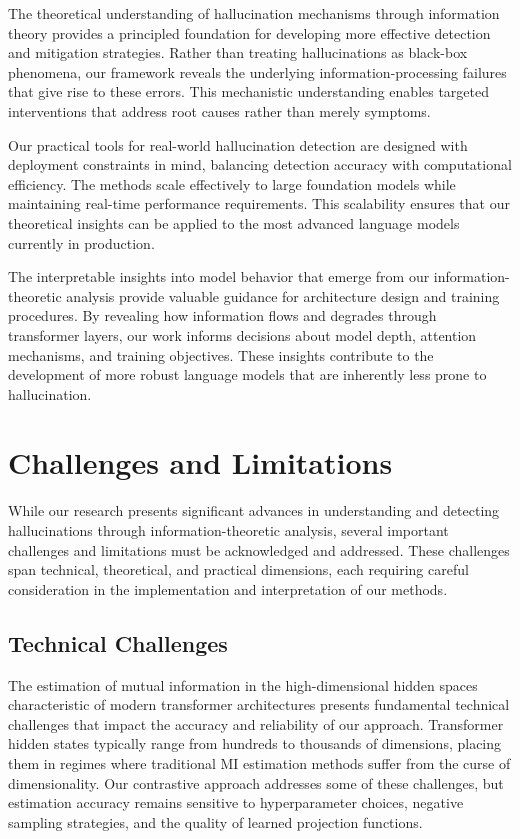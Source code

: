 The theoretical understanding of hallucination mechanisms through information theory provides a principled foundation for developing more effective detection and mitigation strategies. Rather than treating hallucinations as black-box phenomena, our framework reveals the underlying information-processing failures that give rise to these errors. This mechanistic understanding enables targeted interventions that address root causes rather than merely symptoms.

Our practical tools for real-world hallucination detection are designed with deployment constraints in mind, balancing detection accuracy with computational efficiency. The methods scale effectively to large foundation models while maintaining real-time performance requirements. This scalability ensures that our theoretical insights can be applied to the most advanced language models currently in production.

The interpretable insights into model behavior that emerge from our information-theoretic analysis provide valuable guidance for architecture design and training procedures. By revealing how information flows and degrades through transformer layers, our work informs decisions about model depth, attention mechanisms, and training objectives. These insights contribute to the development of more robust language models that are inherently less prone to hallucination.

\section{Challenges and Limitations}
\label{sec:challenges}

While our research presents significant advances in understanding and detecting hallucinations through information-theoretic analysis, several important challenges and limitations must be acknowledged and addressed. These challenges span technical, theoretical, and practical dimensions, each requiring careful consideration in the implementation and interpretation of our methods.

\subsection{Technical Challenges}

The estimation of mutual information in the high-dimensional hidden spaces characteristic of modern transformer architectures presents fundamental technical challenges that impact the accuracy and reliability of our approach. Transformer hidden states typically range from hundreds to thousands of dimensions, placing them in regimes where traditional MI estimation methods suffer from the curse of dimensionality. Our contrastive approach addresses some of these challenges, but estimation accuracy remains sensitive to hyperparameter choices, negative sampling strategies, and the quality of learned projection functions.

